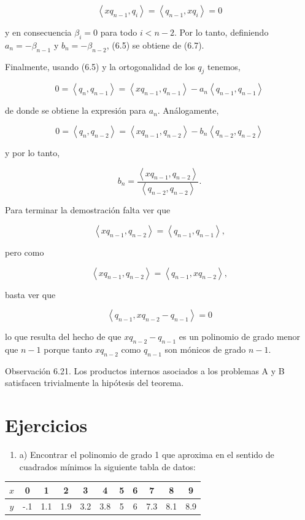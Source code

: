 \documentclass[10pt]{book}
\begin{document}
$$
\left\langle x q_{n-1}, q_{i}\right\rangle=\left\langle q_{n-1}, x q_{i}\right\rangle=0
$$

y en consecuencia $\beta_{i}=0$ para todo $i<n-2$. Por lo tanto, definiendo $a_{n}=-\beta_{n-1}$ y $b_{n}=-\beta_{n-2}$, (6.5) se obtiene de (6.7).

Finalmente, usando (6.5) y la ortogonalidad de los $q_{j}$ tenemos,

$$
0=\left\langle q_{n}, q_{n-1}\right\rangle=\left\langle x q_{n-1}, q_{n-1}\right\rangle-a_{n}\left\langle q_{n-1}, q_{n-1}\right\rangle
$$

de donde se obtiene la expresión para $a_{n}$. Análogamente,

$$
0=\left\langle q_{n}, q_{n-2}\right\rangle=\left\langle x q_{n-1}, q_{n-2}\right\rangle-b_{n}\left\langle q_{n-2}, q_{n-2}\right\rangle
$$

y por lo tanto,

$$
b_{n}=\frac{\left\langle x q_{n-1}, q_{n-2}\right\rangle}{\left\langle q_{n-2}, q_{n-2}\right\rangle} .
$$

Para terminar la demostración falta ver que

$$
\left\langle x q_{n-1}, q_{n-2}\right\rangle=\left\langle q_{n-1}, q_{n-1}\right\rangle,
$$

pero como

$$
\left\langle x q_{n-1}, q_{n-2}\right\rangle=\left\langle q_{n-1}, x q_{n-2}\right\rangle,
$$

basta ver que

$$
\left\langle q_{n-1}, x q_{n-2}-q_{n-1}\right\rangle=0
$$

lo que resulta del hecho de que $x q_{n-2}-q_{n-1}$ es un polinomio de grado menor que $n-1$ porque tanto $x q_{n-2}$ como $q_{n-1}$ son mónicos de grado $n-1$.

Observación 6.21. Los productos internos asociados a los problemas A y B satisfacen trivialmente la hipótesis del teorema.

\section{Ejercicios}
\begin{enumerate}
  \item a) Encontrar el polinomio de grado 1 que aproxima en el sentido de cuadrados mínimos la siguiente tabla de datos:
\end{enumerate}

\begin{center}
\begin{tabular}{|c|c|c|c|c|c|c|c|c|c|c|}
\hline
$x$ & 0 & 1 & 2 & 3 & 4 & 5 & 6 & 7 & 8 & 9 \\
\hline
$y$ & -.1 & 1.1 & 1.9 & 3.2 & 3.8 & 5 & 6 & 7.3 & 8.1 & 8.9 \\
\hline
\end{tabular}
\end{center}
\end{document}

